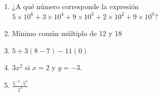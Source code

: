 \documentclass{article}
\begin{document}
\begin{enumerate}
    \item ¿A qué número corresponde la expresión \(5\times 10^6 + 3\times 10^4 + 9\times 10^3 + 2\times 10^2 + 9\times 10^0\)?
    \item Mínimo común múltiplo de 12 y 18
    \item \(5 + 3(8 - 7) - 11(0)\)
    \item \(3x^2\) si \(x = 2\) y \(y = -3\).
    \item \(\frac{5^{-2}\cdot5^4}{5^2}\)
\end{enumerate}
\end{document}
